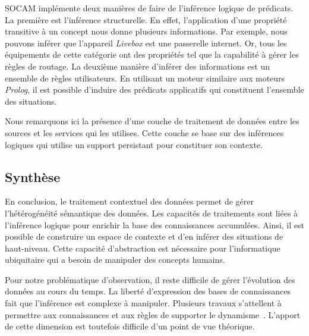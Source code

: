 SOCAM implémente deux manières de faire de l'inférence logique de prédicats. La première est l'inférence structurelle. En effet, l'application d'une propriété transitive à un concept nous donne plusieurs informations. Par exemple, nous pouvons inférer que l'appareil \textit{Livebox} est une passerelle internet. Or, tous les équipements de cette catégorie ont des propriétés tel que la capabilité à gérer les règles de routage. La deuxième manière d'inférer des informations est un ensemble de règles utilisateurs. En utilisant un moteur similaire aux moteurs \textit{Prolog}, il est possible d'induire des prédicats applicatifs qui constituent l'ensemble des situations.

Nous remarquons ici la présence d'une couche de traitement de données entre les sources et les services qui les utilises. Cette couche se base sur des inférences logiques qui utilise un support persistant pour constituer son contexte.

\subsection{Synthèse}
En conclusion, le traitement contextuel des données permet de gérer l'hétérogénéité sémantique des données. Les capacités de traitements sont liées à l'inférence logique pour enrichir la base des connaissances accumulées. Ainsi, il est possible de construire un espace de contexte et d'en inférer des situations de haut-niveau. Cette capacité d'abstraction est nécessaire pour l'informatique ubiquitaire qui a besoin de manipuler des concepts humains.

Pour notre problématique d'observation, il reste difficile de gérer l'évolution des données au cours du temps. La liberté d'expression des bases de connaissances fait que l'inférence est complexe à manipuler. Plusieurs travaux s’attellent à permettre aux connaissances et aux règles de supporter le dynamisme~\cite{Weikum:webknowledge, Hellerstein:declarative}. L'apport de cette dimension est toutefois difficile d'un point de vue théorique.

